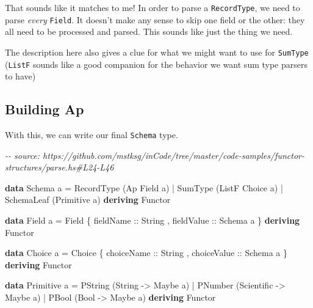 \documentclass[]{article}
\newenvironment{Shaded}{}{}
\newcommand{\CommentTok}[1]{\textcolor[rgb]{0.38,0.63,0.69}{\textit{#1}}}
\newcommand{\DataTypeTok}[1]{\textcolor[rgb]{0.56,0.13,0.00}{#1}}
\newcommand{\KeywordTok}[1]{\textcolor[rgb]{0.00,0.44,0.13}{\textbf{#1}}}
\newcommand{\NormalTok}[1]{#1}
\newcommand{\OperatorTok}[1]{\textcolor[rgb]{0.40,0.40,0.40}{#1}}
\newcommand{\OtherTok}[1]{\textcolor[rgb]{0.00,0.44,0.13}{#1}}
\begin{document}
That sounds like it matches to me! In order to parse a \texttt{RecordType}, we
need to parse \emph{every} \texttt{Field}. It doesn't make any sense to skip one
field or the other: they all need to be processed and parsed. This sounds like
just the thing we need.

The description here also gives a clue for what we might want to use for
\texttt{SumType} (\texttt{ListF} sounds like a good companion for the behavior
we want sum type parsers to have)

\hypertarget{building-ap}{%
\subsection{Building Ap}\label{building-ap}}

With this, we can write our final \texttt{Schema} type.

\begin{Shaded}
\begin{Highlighting}[]
\CommentTok{{-}{-} source: https://github.com/mstksg/inCode/tree/master/code{-}samples/functor{-}structures/parse.hs\#L24{-}L46}

\KeywordTok{data} \DataTypeTok{Schema}\NormalTok{ a }\OtherTok{=}
      \DataTypeTok{RecordType}\NormalTok{  (}\DataTypeTok{Ap} \DataTypeTok{Field}\NormalTok{ a)}
    \OperatorTok{|} \DataTypeTok{SumType}\NormalTok{     (}\DataTypeTok{ListF} \DataTypeTok{Choice}\NormalTok{ a)}
    \OperatorTok{|} \DataTypeTok{SchemaLeaf}\NormalTok{  (}\DataTypeTok{Primitive}\NormalTok{ a)}
  \KeywordTok{deriving} \DataTypeTok{Functor}

\KeywordTok{data} \DataTypeTok{Field}\NormalTok{ a }\OtherTok{=} \DataTypeTok{Field}
\NormalTok{    \{}\OtherTok{ fieldName  ::} \DataTypeTok{String}
\NormalTok{    ,}\OtherTok{ fieldValue ::} \DataTypeTok{Schema}\NormalTok{ a}
\NormalTok{    \}}
  \KeywordTok{deriving} \DataTypeTok{Functor}

\KeywordTok{data} \DataTypeTok{Choice}\NormalTok{ a }\OtherTok{=} \DataTypeTok{Choice}
\NormalTok{    \{}\OtherTok{ choiceName  ::} \DataTypeTok{String}
\NormalTok{    ,}\OtherTok{ choiceValue ::} \DataTypeTok{Schema}\NormalTok{ a}
\NormalTok{    \}}
  \KeywordTok{deriving} \DataTypeTok{Functor}

\KeywordTok{data} \DataTypeTok{Primitive}\NormalTok{ a }\OtherTok{=}
      \DataTypeTok{PString}\NormalTok{ (}\DataTypeTok{String} \OtherTok{{-}>} \DataTypeTok{Maybe}\NormalTok{ a)}
    \OperatorTok{|} \DataTypeTok{PNumber}\NormalTok{ (}\DataTypeTok{Scientific} \OtherTok{{-}>} \DataTypeTok{Maybe}\NormalTok{ a)}
    \OperatorTok{|} \DataTypeTok{PBool}\NormalTok{   (}\DataTypeTok{Bool} \OtherTok{{-}>} \DataTypeTok{Maybe}\NormalTok{ a)}
  \KeywordTok{deriving} \DataTypeTok{Functor}
\end{Highlighting}
\end{Shaded}
\end{document}
